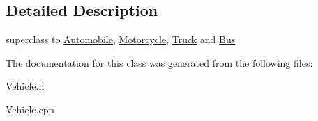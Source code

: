 \subsection{Detailed Description}
superclass to \hyperlink{class_automobile}{Automobile}, \hyperlink{class_motorcycle}{Motorcycle}, \hyperlink{class_truck}{Truck} and \hyperlink{class_bus}{Bus} 

The documentation for this class was generated from the following files\+:\begin{DoxyCompactItemize}
\item 
Vehicle.\+h\item 
Vehicle.\+cpp\end{DoxyCompactItemize}
